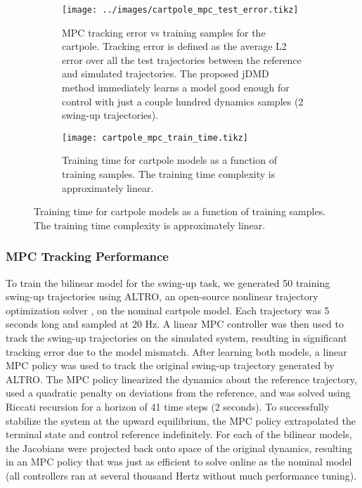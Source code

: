 \documentclass{article}
\begin{document}
\begin{figure}[t]
  \centering
  \begin{subfigure}[t]{0.48\textwidth}
    \raggedleft
    \texttt{[image: ../images/cartpole\_mpc\_test\_error.tikz]}
    \caption{MPC tracking error vs training samples for the cartpole. Tracking error is
    defined as the average L2 error over all the test trajectories between the reference and
    simulated trajectories. The proposed jDMD method immediately learns a model good enough
    for control with just a couple hundred dynamics samples (2 swing-up trajectories).}
    \label{fig:cartpole_mpc_test_error}
  \end{subfigure}
  \hfill
  \begin{subfigure}[t]{0.48\textwidth}
    \raggedright
    \texttt{[image: cartpole\_mpc\_train\_time.tikz]}
    \caption{Training time for cartpole models as a function of training samples. The 
    training time complexity is approximately linear.}
    \label{fig:cartpole_train_time}
  \end{subfigure}
\end{figure}

\subsubsection{MPC Tracking Performance}

To train the bilinear model for the swing-up task, we generated 50 training swing-up
trajectories using ALTRO, an open-source nonlinear trajectory optimization solver 
\cite{Howell2019,Jackson2021}, on the nominal cartpole model. Each trajectory was 5 seconds
long and sampled at 20 Hz.  A linear MPC controller was then used to track the swing-up
trajectories on the simulated system, resulting in significant tracking error due to the
model mismatch.  After learning both models, a linear MPC policy was used to track the
original swing-up trajectory generated by ALTRO. The MPC policy linearized the dynamics
about the reference trajectory, used a quadratic penalty on deviations from the reference,
and was solved using Riccati recursion for a horizon of 41 time steps (2 seconds). To
successfully stabilize the system at the upward equilibrium, the MPC policy extrapolated the
terminal state and control reference indefinitely. For each of the bilinear models, the
Jacobians were projected back onto space of the original dynamics, resulting in an MPC
policy that was just as efficient to solve online as the nominal model (all controllers ran
at several thousand Hertz without much performance tuning). 
\end{document}

